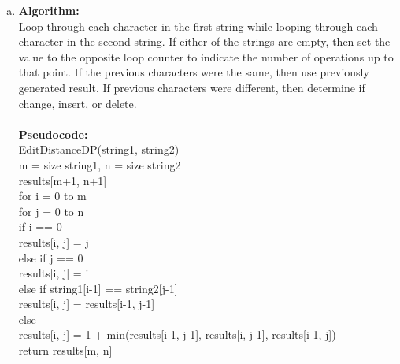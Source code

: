 \documentclass[11pt]{article}
\begin{document}
\begin{enumerate}
		\begin{enumerate}[(a)]
			\item
				\textbf{Algorithm:} \\
					\hspace*{.5cm}
					Loop through each character in the first string while looping through each character in the second string. If either of the strings are empty, then set the value to the opposite loop counter to indicate the number of operations up to that point. If the previous characters were the same, then use previously generated result. If previous characters were different, then determine if change, insert, or delete. \\ \\
				\textbf{Pseudocode:} \\
					\hspace*{.5cm}
					EditDistanceDP(string1, string2) \\
						\hspace*{1cm}
						m = size string1, n = size string2 \\
						\hspace*{1cm}
						results[m+1, n+1] \\
						\hspace*{1cm}
						for i = 0 to m \\
							\hspace*{1.5cm}
							for j = 0 to n \\
								\hspace*{2cm}
								if i == 0 \\
									\hspace*{2.5cm}
									results[i, j] = j \\
								\hspace*{2cm}
								else if j == 0 \\
									\hspace*{2.5cm}
									results[i, j] = i \\
								\hspace*{2cm}
								else if string1[i-1] == string2[j-1] \\
									\hspace*{2.5cm}
									results[i, j] = results[i-1, j-1] \\
								\hspace*{2cm}
								else \\
									\hspace*{2.5cm}
									results[i, j] = 1 + min(results[i-1, j-1], results[i, j-1], results[i-1, j]) \\
						\hspace*{1cm}
						return results[m, n]
				

\end{enumerate}
\end{enumerate}
\end{document}
